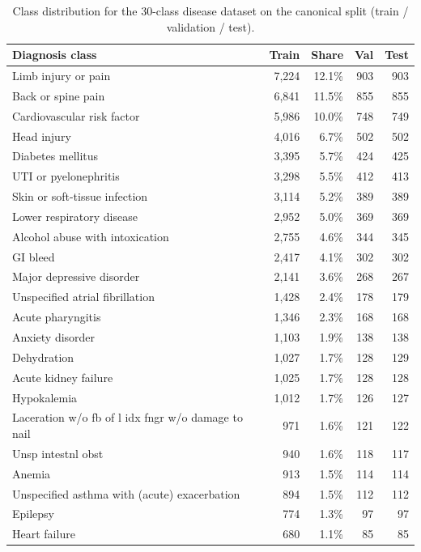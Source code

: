 \begin{table}[htbp]
  \centering
  \small
  \caption{Class distribution for the 30-class disease dataset on the canonical
    split (train / validation / test).}
  \label{tab:class-dist}
  \begin{tabular}{lrrrr}
    \toprule
    Diagnosis class & Train & Share & Val & Test \\
    \midrule
    Limb injury or pain & 7{,}224 & 12.1\% & 903 & 903 \\
    Back or spine pain & 6{,}841 & 11.5\% & 855 & 855 \\
    Cardiovascular risk factor & 5{,}986 & 10.0\% & 748 & 749 \\
    Head injury & 4{,}016 & 6.7\% & 502 & 502 \\
    Diabetes mellitus & 3{,}395 & 5.7\% & 424 & 425 \\
    UTI or pyelonephritis & 3{,}298 & 5.5\% & 412 & 413 \\
    Skin or soft-tissue infection & 3{,}114 & 5.2\% & 389 & 389 \\
    Lower respiratory disease & 2{,}952 & 5.0\% & 369 & 369 \\
    Alcohol abuse with intoxication & 2{,}755 & 4.6\% & 344 & 345 \\
    GI bleed & 2{,}417 & 4.1\% & 302 & 302 \\
    Major depressive disorder & 2{,}141 & 3.6\% & 268 & 267 \\
    Unspecified atrial fibrillation & 1{,}428 & 2.4\% & 178 & 179 \\
    Acute pharyngitis & 1{,}346 & 2.3\% & 168 & 168 \\
    Anxiety disorder & 1{,}103 & 1.9\% & 138 & 138 \\
    Dehydration & 1{,}027 & 1.7\% & 128 & 129 \\
    Acute kidney failure & 1{,}025 & 1.7\% & 128 & 128 \\
    Hypokalemia & 1{,}012 & 1.7\% & 126 & 127 \\
    Laceration w/o fb of l idx fngr w/o damage to nail & 971 & 1.6\% & 121 & 122 \\
    Unsp intestnl obst & 940 & 1.6\% & 118 & 117 \\
    Anemia & 913 & 1.5\% & 114 & 114 \\
    Unspecified asthma with (acute) exacerbation & 894 & 1.5\% & 112 & 112 \\
    Epilepsy & 774 & 1.3\% & 97 & 97 \\
    Heart failure & 680 & 1.1\% & 85 & 85 \\

\end{tabular}
\end{table}
